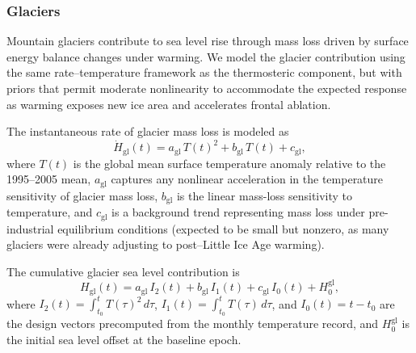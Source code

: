 \documentclass[11pt]{article}
\begin{document}
	\subsubsection{Glaciers}

Mountain glaciers contribute to sea level rise through mass loss driven by surface energy balance changes under warming. We model the glacier contribution using the same rate--temperature framework as the thermosteric component, but with priors that permit moderate nonlinearity to accommodate the expected response as warming exposes new ice area and accelerates frontal ablation.

The instantaneous rate of glacier mass loss is modeled as
\begin{equation}
	\dot{H}_{\mathrm{gl}}(t) = a_{\mathrm{gl}}\, T(t)^2 + b_{\mathrm{gl}}\, T(t) + c_{\mathrm{gl}},
	\label{eq:glacier_rate}
\end{equation}
where $T(t)$ is the global mean surface temperature anomaly relative to the 1995--2005 mean, $a_{\mathrm{gl}}$ captures any nonlinear acceleration in the temperature sensitivity of glacier mass loss, $b_{\mathrm{gl}}$ is the linear mass-loss sensitivity to temperature, and $c_{\mathrm{gl}}$ is a background trend representing mass loss under pre-industrial equilibrium conditions (expected to be small but nonzero, as many glaciers were already adjusting to post--Little Ice Age warming).

The cumulative glacier sea level contribution is
\begin{equation}
	H_{\mathrm{gl}}(t) = a_{\mathrm{gl}}\, I_2(t) + b_{\mathrm{gl}}\, I_1(t) + c_{\mathrm{gl}}\, I_0(t) + H_0^{\mathrm{gl}},
	\label{eq:glacier_level}
\end{equation}
where $I_2(t) = \int_{t_0}^{t} T(\tau)^2\, d\tau$, $I_1(t) = \int_{t_0}^{t} T(\tau)\, d\tau$, and $I_0(t) = t - t_0$ are the design vectors precomputed from the monthly temperature record, and $H_0^{\mathrm{gl}}$ is the initial sea level offset at the baseline epoch.
\end{document}
